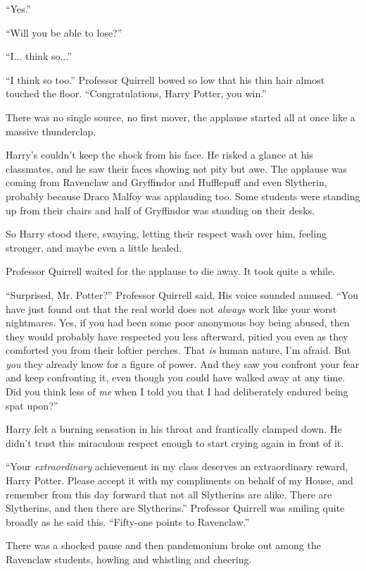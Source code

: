 ``Yes.''

``Will you be able to lose?''

``I... think so...''

``I think so too.'' Professor Quirrell bowed so low that his thin hair almost touched the floor. ``Congratulations, Harry Potter, you win.''

There was no single source, no first mover, the applause started all at once like a massive thunderclap.

Harry's couldn't keep the shock from his face. He risked a glance at his classmates, and he saw their faces showing not pity but awe. The applause was coming from Ravenclaw and Gryffindor and Hufflepuff and even Slytherin, probably because Draco Malfoy was applauding too. Some students were standing up from their chairs and half of Gryffindor was standing on their desks.

So Harry stood there, swaying, letting their respect wash over him, feeling stronger, and maybe even a little healed.

Professor Quirrell waited for the applause to die away. It took quite a while.

``Surprised, Mr. Potter?'' Professor Quirrell said. His voice sounded amused. ``You have just found out that the real world does not \emph{always} work like your worst nightmares. Yes, if you had been some poor anonymous boy being abused, then they would probably have respected you less afterward, pitied you even as they comforted you from their loftier perches. That \emph{is} human nature, I'm afraid. But \emph{you} they already know for a figure of power. And they saw you confront your fear and keep confronting it, even though you could have walked away at any time. Did you think less of \emph{me} when I told you that I had deliberately endured being spat upon?''

Harry felt a burning sensation in his throat and frantically clamped down. He didn't trust this miraculous respect enough to start crying again in front of it.

``Your \emph{extraordinary} achievement in my class deserves an extraordinary reward, Harry Potter. Please accept it with my compliments on behalf of my House, and remember from this day forward that not all Slytherins are alike. There are Slytherins, and then there are Slytherins.'' Professor Quirrell was smiling quite broadly as he said this. ``Fifty-one points to Ravenclaw.''

There was a shocked pause and then pandemonium broke out among the Ravenclaw students, howling and whistling and cheering.

